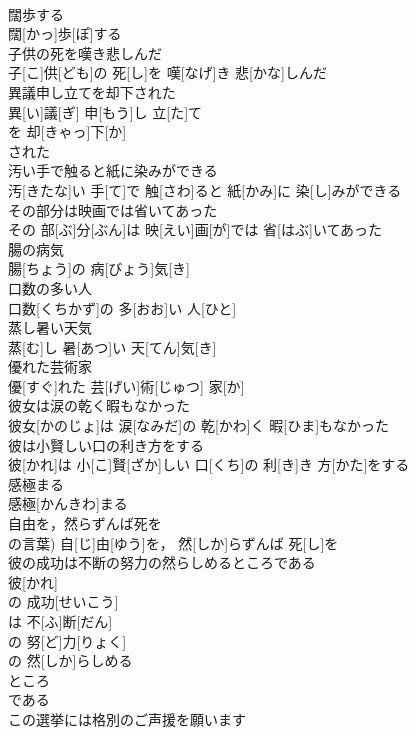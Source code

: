\documentclass[8pt]{extreport}
\begin{document}
\begin{CJK}{UTF8}{min}
\\	闊歩する	
\\	闊[かっ]歩[ぽ]する
\\	子供の死を嘆き悲しんだ	
\\	子[こ]供[ども]の 死[し]を 嘆[なげ]き 悲[かな]しんだ
\\	異議申し立てを却下された	
\\	異[い]議[ぎ] 申[もう]し 立[た]て 
\\	を 却[きゃっ]下[か]
\\	された
\\	汚い手で触ると紙に染みができる	
\\	汚[きたな]い 手[て]で 触[さわ]ると 紙[かみ]に 染[し]みができる
\\	その部分は映画では省いてあった	
\\	その 部[ぶ]分[ぶん]は 映[えい]画[が]では 省[はぶ]いてあった
\\	腸の病気	
\\	腸[ちょう]の 病[びょう]気[き]
\\	口数の多い人	
\\	口数[くちかず]の 多[おお]い 人[ひと]
\\	蒸し暑い天気	
\\	蒸[む]し 暑[あつ]い 天[てん]気[き]
\\	優れた芸術家	
\\	優[すぐ]れた 芸[げい]術[じゅつ] 家[か]
\\	彼女は涙の乾く暇もなかった	
\\	彼女[かのじょ]は 涙[なみだ]の 乾[かわ]く 暇[ひま]もなかった
\\	彼は小賢しい口の利き方をする	
\\	彼[かれ]は 小[こ]賢[ざか]しい 口[くち]の 利[き]き 方[かた]をする
\\	感極まる	
\\	感極[かんきわ]まる
\\	自由を，然らずんば死を	
\\	の言葉)	自[じ]由[ゆう]を， 然[しか]らずんば 死[し]を
\\	彼の成功は不断の努力の然らしめるところである	
\\	彼[かれ]
\\	の 成功[せいこう]
\\	は 不[ふ]断[だん]
\\	の 努[ど]力[りょく]
\\	の 然[しか]らしめる 
\\	ところ 
\\	である
\\	この選挙には格別のご声援を願います	

\end{CJK}
\end{document}
